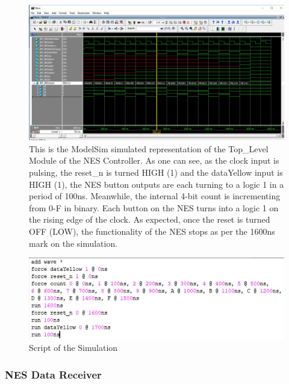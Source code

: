 \documentclass[a4paper]{article}
\begin{document}
\begin{figure}[H]
  \centering
    \includegraphics[width=.85\textwidth]{images/ModelSim/nesreader.JPG}
	\caption{This is the ModelSim simulated representation of the Top_Level Module of the NES Controller. As one can see, as the clock input is pulsing, the reset_n is turned HIGH (1) and the dataYellow input is HIGH (1), the NES button outputs are each turning to a logic 1 in a period of 100ns. Meanwhile, the internal 4-bit count is incrementing from 0-F in binary. Each button on the NES turns into a logic 1 on the rising edge of the clock. As expected, once the reset is turned OFF (LOW), the functionality of the NES stops as per the 1600ns mark on the simulation.}
    \label{fig:top_level_block_sim}
\end{figure}

\begin{figure}[H]
  \centering
    \includegraphics[width=.85\textwidth]{images/ModelSim/nesdo.JPG}
	\caption{Script of the Simulation}
    \label{fig:top_level_do}
\end{figure}

\subsubsection{NES Data Receiver}
\end{document}
